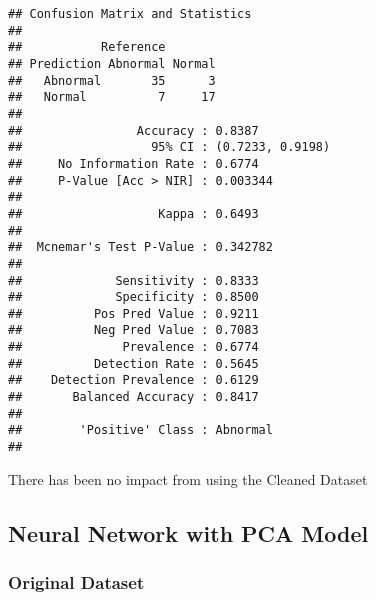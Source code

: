 \documentclass[
]{article}
\newenvironment{Shaded}{\begin{snugshade}}{\end{snugshade}}
\newcommand{\DataTypeTok}[1]{\textcolor[rgb]{0.13,0.29,0.53}{#1}}
\newcommand{\DecValTok}[1]{\textcolor[rgb]{0.00,0.00,0.81}{#1}}
\newcommand{\KeywordTok}[1]{\textcolor[rgb]{0.13,0.29,0.53}{\textbf{#1}}}
\newcommand{\NormalTok}[1]{#1}
\newcommand{\OperatorTok}[1]{\textcolor[rgb]{0.81,0.36,0.00}{\textbf{#1}}}
\newcommand{\OtherTok}[1]{\textcolor[rgb]{0.56,0.35,0.01}{#1}}
\newcommand{\StringTok}[1]{\textcolor[rgb]{0.31,0.60,0.02}{#1}}
\begin{document}
\begin{verbatim}
## Confusion Matrix and Statistics
## 
##           Reference
## Prediction Abnormal Normal
##   Abnormal       35      3
##   Normal          7     17
##                                           
##                Accuracy : 0.8387          
##                  95% CI : (0.7233, 0.9198)
##     No Information Rate : 0.6774          
##     P-Value [Acc > NIR] : 0.003344        
##                                           
##                   Kappa : 0.6493          
##                                           
##  Mcnemar's Test P-Value : 0.342782        
##                                           
##             Sensitivity : 0.8333          
##             Specificity : 0.8500          
##          Pos Pred Value : 0.9211          
##          Neg Pred Value : 0.7083          
##              Prevalence : 0.6774          
##          Detection Rate : 0.5645          
##    Detection Prevalence : 0.6129          
##       Balanced Accuracy : 0.8417          
##                                           
##        'Positive' Class : Abnormal        
## 
\end{verbatim}

There has been no impact from using the Cleaned Dataset

\hypertarget{neural-network-with-pca-model}{%
\subsection{Neural Network with PCA
Model}\label{neural-network-with-pca-model}}

\hypertarget{original-dataset-6}{%
\subsubsection{Original Dataset}\label{original-dataset-6}}

\begin{Shaded}
\end{Shaded}
\end{document}
